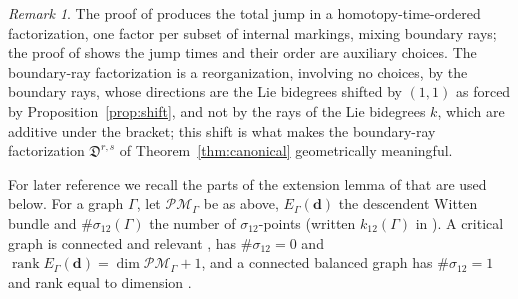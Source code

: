 \documentclass[11pt]{amsart}
\theoremstyle{definition}
\theoremstyle{remark}
\newtheorem{remark}[theorem]{Remark}
\newcommand{\Dscr}{\mathfrak{D}}
\begin{document}
\begin{remark}
\label{rem:timeorder}
The proof of \cite[Thm.~5.9]{GKT} produces the total jump in a homotopy-time-ordered factorization, one factor per subset of internal markings, mixing boundary rays;
the proof of \cite[Lem.~3.40]{GKT} shows the jump times and their order are auxiliary
choices. The boundary-ray factorization is a reorganization, involving no
choices, by the boundary rays, whose directions are the Lie bidegrees
shifted by $(1,1)$ as forced by Proposition~\ref{prop:shift}, and not by the
rays of the Lie bidegrees $k$, which are additive under the bracket; this
shift is what makes the boundary-ray factorization $\Dscr^{r,s}$ of
Theorem~\ref{thm:canonical} geometrically meaningful.
\end{remark}

For later reference we recall the parts of the extension lemma of \cite{GKT}
that are used below.  For a graph $\Gamma$, let $\mathcal{PM}_\Gamma$ be as
above, $E_\Gamma(\mathbf d)$ the descendent Witten bundle and $\#\sigma_{12}(\Gamma)$
the number of $\sigma_{12}$-points (written $k_{12}(\Gamma)$ in \cite{GKT}).  A critical graph is connected and
relevant \cite[Def.~1.57]{GKT}, has $\#\sigma_{12}=0$ and $\operatorname{rank}E_\Gamma(\mathbf d)=\dim\mathcal{PM}_\Gamma+1$,
and a connected balanced graph has $\#\sigma_{12}=1$ and rank equal to dimension
\cite[Defs.~2.32--2.33]{GKT}.
\end{document}
